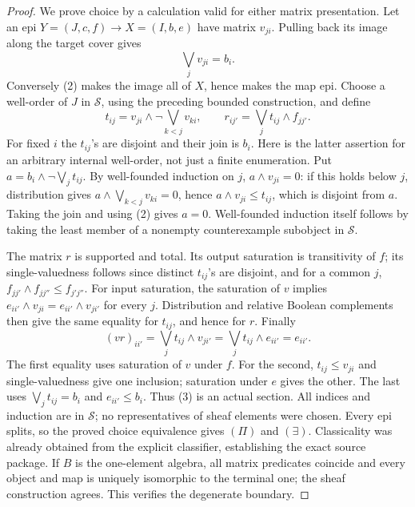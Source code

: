 \begin{proof}
We prove choice by a calculation valid for either matrix presentation.
Let an epi \(Y=(J,c,f)\to X=(I,b,e)\) have matrix
\(v_{ji}\). Pulling back its image along the target cover gives
\[
                   \bigvee_j v_{ji}=b_i.                 \tag{2}
\]
Conversely (2) makes the image all of \(X\), hence makes the map
epi. Choose a well-order of \(J\) in \(\mathcal S\), using the
preceding bounded construction, and define
\[
 t_{ij}=v_{ji}\wedge\neg\bigvee_{k<j}v_{ki},\qquad
 r_{ij'}=\bigvee_j t_{ij}\wedge f_{jj'}.                \tag{3}
\]
For fixed \(i\) the \(t_{ij}\)'s are disjoint and their join
is \(b_i\). Here is the latter assertion for an arbitrary internal
well-order, not just a finite enumeration. Put
\(a=b_i\wedge\neg\bigvee_j t_{ij}\). By well-founded induction
on \(j\), \(a\wedge v_{ji}=0\): if this holds below \(j\),
distribution gives \(a\wedge\bigvee_{k<j}v_{ki}=0\), hence
\(a\wedge v_{ji}\le t_{ij}\), which is disjoint from \(a\).
Taking the join and using (2) gives \(a=0\). Well-founded induction
itself follows by taking the least member of a nonempty counterexample
subobject in \(\mathcal S\).

The matrix \(r\) is supported and total. Its output saturation is
transitivity of \(f\); its single-valuedness follows since distinct
\(t_{ij}\)'s are disjoint, and for a common \(j\),
\(f_{jj'}\wedge f_{jj''}\le f_{j'j''}\). For input saturation,
the saturation of \(v\) implies
\(e_{ii'}\wedge v_{ji}=e_{ii'}\wedge v_{ji'}\) for every
\(j\). Distribution and relative Boolean complements then give
the same equality for \(t_{ij}\), and hence for \(r\).
Finally
\[
 (vr)_{ii'}=\bigvee_j t_{ij}\wedge v_{ji'}
           =\bigvee_j t_{ij}\wedge e_{ii'}=e_{ii'}.
\]
The first equality uses saturation of \(v\) under \(f\).
For the second, \(t_{ij}\le v_{ji}\) and single-valuedness
give one inclusion; saturation under \(e\) gives the other.
The last uses \(\bigvee_j t_{ij}=b_i\) and \(e_{ii'}\le b_i\).
Thus (3) is an actual section. All indices and induction are in
\(\mathcal S\); no representatives of sheaf elements were chosen.
Every epi splits, so the proved choice equivalence gives
\((\Pi)\) and \((\exists)\). Classicality was already obtained
from the explicit classifier, establishing the exact source package.
If \(B\) is the one-element algebra, all matrix predicates coincide
and every object and map is uniquely isomorphic to the terminal one;
the sheaf construction agrees. This verifies the degenerate boundary.
\end{proof}

